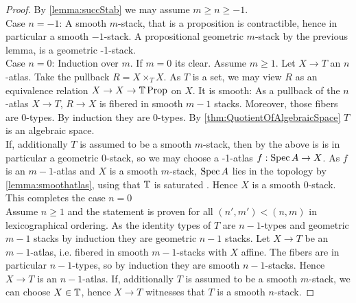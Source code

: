 \documentclass{article}
\begin{document}
\begin{proof}
    By \ref{lemma:succStab} we may assume $m \ge n \ge -1$. \\
    Case $n=-1$: A smooth $m$-stack, that is a proposition is contractible, hence in particular a smooth $-1$-stack. A propositional geometric $m$-stack by the previous lemma, is a geometric -1-stack. \\
    Case $n =0$: Induction over $m$. If $m=0$ its clear. Assume $m \ge 1$. Let $X \to T$ an $n$-atlas. Take the pullback $R = X \times_T X$. As $T$ is a set, we may view $R$ as an equivalence relation $X \to X \to \mathbb{T} \operatorname{Prop}$ on $X$. It is smooth: As a pullback of the $n$-atlas $X \to T$, $R \to X$ is fibered in smooth $m-1$ stacks. Moreover, those fibers are 0-types. By induction they are 0-types. By \ref{thm:QuotientOfAlgebraicSpace} $T$ is an algebraic space. \\
    If, additionally $T$ is assumed to be a smooth $m$-stack, then by the above is is in particular a geometric 0-stack, so we may choose a -1-atlas $f : \operatorname{Spec} A \to X$. As $f$ is an $m-1$-atlas and $X$ is a smooth $m$-stack, $\operatorname{Spec} A$ lies in the topology by \ref{lemma:smoothatlas}, using that $\mathbb{T}$ is saturated . Hence $X$ is a smooth 0-stack. This completes the case $n=0$ \\
    Assume $n \ge 1$ and the statement is proven for all $(n',m') < (n,m)$ in lexicographical ordering. As the identity types of $T$ are $n-1$-types and geometric $m-1$ stacks by induction they are geometric $n-1$ stacks. Let $X \to T$ be an $m-1$-atlas, i.e. fibered in smooth $m-1$-stacks with $X$ affine. The fibers are in particular $n-1$-types, so by induction they are smooth $n-1$-stacks. Hence $X \to T$ is an $n-1$-atlas. If, additionally $T$ is assumed to be a smooth $m$-stack, we can choose $X \in \mathbb{T}$, hence $X \to T$ witnesses that $T$ is a smooth $n$-stack.
    
\end{proof}
\end{document}
